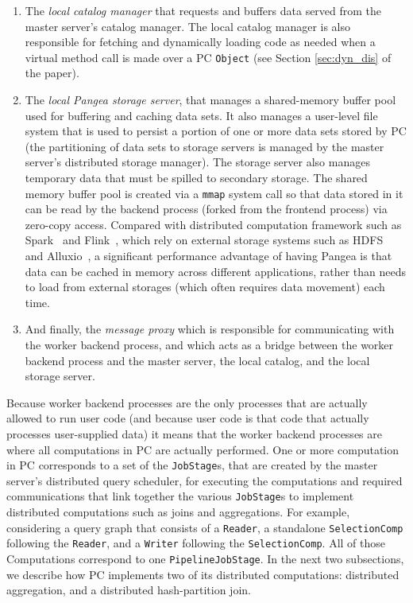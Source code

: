 \begin{enumerate}
\item The \emph{local catalog manager} that requests and 
buffers data served from the master server's catalog manager.  The local catalog manager is also responsible for fetching and dynamically loading
code as needed when a virtual method call is made over a PC \texttt{Object} (see Section \ref{sec:dyn_dis} of the paper).
\item The \emph{local Pangea storage server}, that manages a
  shared-memory buffer pool used for buffering and caching data sets.  It also manages
a  user-level file system that is used to persist a portion of one or more data sets stored by PC (the partitioning of data sets to storage servers is managed
by the master server's distributed storage manager).  The storage server also manages temporary data that must be spilled to secondary storage.
The shared memory buffer pool is created via a \texttt{mmap} system call so that
data stored in it can be read by the backend process (forked from
the frontend process) via zero-copy access. Compared with distributed
computation framework such as Spark~\cite{zaharia2010spark} and Flink~\cite{alexandrov2014stratosphere, carbone2015apache}, which rely on
external storage systems such as HDFS~\cite{borthakur2008hdfs} and Alluxio~\cite{li2014tachyon}, a significant
performance advantage of having Pangea is that data can be cached in memory
across different applications, rather than needs to load from external
storages (which often requires data movement) each time.
\item And finally, the \emph{message proxy} which is responsible for communicating with the worker backend process, and which acts as a bridge between the
worker backend process and the master server, the local catalog, and the local storage server.

\end{enumerate}

Because worker backend processes are the only processes that are actually allowed to run user code (and because user code is that code that actually processes
user-supplied data) it means that the worker backend processes are
where all computations in PC are actually performed.  One or more computation in PC corresponds 
to a set of the 
\texttt{JobStage}s, that are created by the master server's distributed query scheduler, 
for executing the computations and required communications
that link together the various \texttt{JobStage}s to implement distributed
computations such as joins and aggregations. 
For example, considering a query graph that consists of a \texttt{Reader}, a standalone \texttt{SelectionComp} following
the \texttt{Reader}, and a
\texttt{Writer} following the \texttt{SelectionComp}. All of those Computations correspond
to one \texttt{PipelineJobStage}. In the next two subsections, we
describe how PC implements two of its distributed computations:
distributed aggregation, and a distributed hash-partition join.


